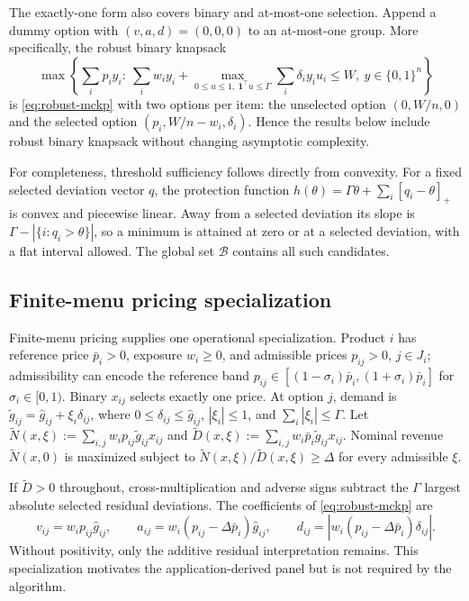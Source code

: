 \documentclass[11pt]{article}
\theoremstyle{plain}
\theoremstyle{definition}
\theoremstyle{remark}
\newcommand{\B}{\mathcal B}
\newcommand{\pos}[1]{[#1]_+}
\begin{document}
The exactly-one form also covers binary and at-most-one selection.  Append a dummy option with $(v,a,d)=(0,0,0)$ to an at-most-one group.  More specifically, the robust binary knapsack
\[
\max\left\{\sum_i p_i y_i:\ \sum_i w_i y_i+
\max_{0\le u\le1,\ \mathbf 1^\top u\le\Gamma}\sum_i\delta_i y_i u_i\le W,
\ y\in\{0,1\}^n\right\}
\]
is \eqref{eq:robust-mckp} with two options per item: the unselected option $(0,W/n,0)$ and the selected option $(p_i,W/n-w_i,\delta_i)$.  Hence the results below include robust binary knapsack without changing asymptotic complexity.

For completeness, threshold sufficiency follows directly from convexity.  For a fixed selected deviation vector $q$, the protection function $h(\theta)=\Gamma\theta+\sum_i\pos{q_i-\theta}$ is convex and piecewise linear.  Away from a selected deviation its slope is $\Gamma-|\{i:q_i>\theta\}|$, so a minimum is attained at zero or at a selected deviation, with a flat interval allowed.  The global set $\B$ contains all such candidates.

\subsection{Finite-menu pricing specialization}\label{sec:pricing-specialization}

Finite-menu pricing supplies one operational specialization.  Product $i$ has reference price $\bar p_i>0$, exposure $w_i\ge0$, and admissible prices $p_{ij}>0$, $j\in J_i$; admissibility can encode the reference band $p_{ij}\in[(1-\sigma_i)\bar p_i,(1+\sigma_i)\bar p_i]$ for $\sigma_i\in[0,1)$.  Binary $x_{ij}$ selects exactly one price.  At option $j$, demand is $\widetilde g_{ij}=\hat g_{ij}+\xi_i\delta_{ij}$, where $0\le\delta_{ij}\le\hat g_{ij}$, $|\xi_i|\le1$, and $\sum_i|\xi_i|\le\Gamma$.  Let $\widetilde N(x,\xi):=\sum_{i,j}w_ip_{ij}\widetilde g_{ij}x_{ij}$ and $\widetilde D(x,\xi):=\sum_{i,j}w_i\bar p_i\widetilde g_{ij}x_{ij}$.  Nominal revenue $\widetilde N(x,0)$ is maximized subject to $\widetilde N(x,\xi)/\widetilde D(x,\xi)\ge\Delta$ for every admissible $\xi$.

If $\widetilde D>0$ throughout, cross-multiplication and adverse signs subtract the $\Gamma$ largest absolute selected residual deviations.  The coefficients of \eqref{eq:robust-mckp} are
\begin{equation}\label{eq:pricing-map}
v_{ij}=w_ip_{ij}\hat g_{ij},\qquad
a_{ij}=w_i(p_{ij}-\Delta\bar p_i)\hat g_{ij},\qquad
d_{ij}=\left|w_i(p_{ij}-\Delta\bar p_i)\delta_{ij}\right|.
\end{equation}
Without positivity, only the additive residual interpretation remains.  This specialization motivates the application-derived panel but is not required by the algorithm.
\end{document}
